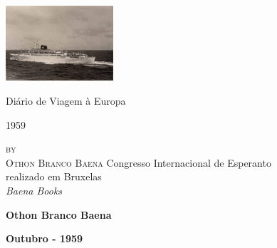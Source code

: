 \documentclass[toc=chapterentrywithdots]{scrbook}
\begin{document}

\begin{titlepage}
        \centering
        \includegraphics[width=4cm]{capa_diario.jpg}\par
        \vspace{4\baselineskip}
        {\Huge Diário de Viagem à Europa\\ \par}
        \vspace{2\baselineskip}
        {\Large 1959 \\ \par}
        \vspace{4\baselineskip}
        {\large\textsc{by\\[.5em]Othon Branco Baena}}
        \vfill
        Congresso Internacional de Esperanto\\realizado em Bruxelas\\[1em]
        {\em Baena Books}
 \end{titlepage}
 
\tableofcontents







\begin{center}
  \textbf{Othon Branco Baena}
  
    \textbf{Outubro - 1959}
\end{center}
\end{document}
